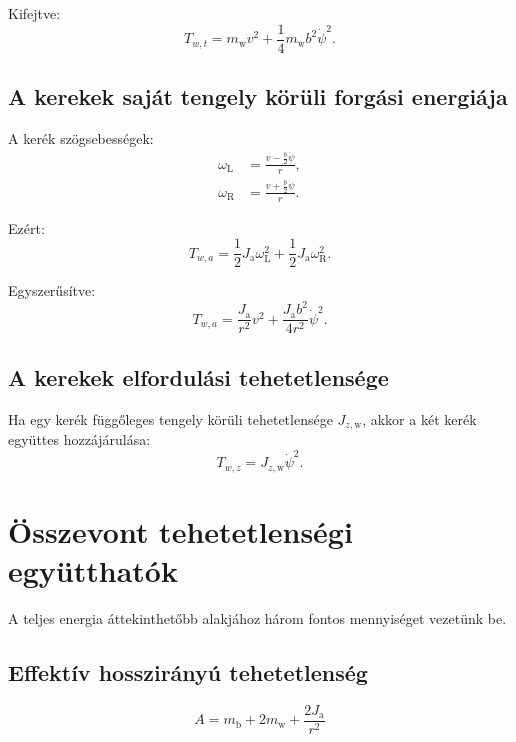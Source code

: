 \documentclass[12pt,a4paper]{article}
\newcommand{\mbody}{m_{\mathrm{b}}}
\newcommand{\mwheel}{m_{\mathrm{w}}}
\newcommand{\Jspin}{J_{\mathrm{a}}}
\newcommand{\Jzw}{J_{z,\mathrm{w}}}
\newcommand{\omegaL}{\omega_{\mathrm{L}}}
\newcommand{\omegaR}{\omega_{\mathrm{R}}}
\begin{document}
	Kifejtve:
	\begin{equation}
		T_{w,t}=\mwheel v^2+\frac{1}{4}\mwheel b^2\dot\psi^2.
	\end{equation}
	
	\subsection{A kerekek saját tengely körüli forgási energiája}
	
	A kerék szögsebességek:
	\begin{align*}
		\omegaL &= \frac{v-\frac{b}{2}\dot\psi}{r},\\
		\omegaR &= \frac{v+\frac{b}{2}\dot\psi}{r}.
	\end{align*}
	
	Ezért:
	\begin{equation}
		T_{w,a}=\frac{1}{2}\Jspin\omegaL^2+
		\frac{1}{2}\Jspin\omegaR^2.
	\end{equation}
	
	Egyszerűsítve:
	\begin{equation}
		T_{w,a}=\frac{\Jspin}{r^2}v^2
		+\frac{\Jspin b^2}{4r^2}\dot\psi^2.
	\end{equation}
	
	\subsection{A kerekek elfordulási tehetetlensége}
	
	Ha egy kerék függőleges tengely körüli tehetetlensége $\Jzw$, akkor a két kerék együttes hozzájárulása:
	\begin{equation}
		T_{w,z}=\Jzw\dot\psi^2.
	\end{equation}
	
	\section{Összevont tehetetlenségi együtthatók}
	
	A teljes energia áttekinthetőbb alakjához három fontos mennyiséget vezetünk be.
	
	\subsection{Effektív hosszirányú tehetetlenség}
	
	\begin{equation}
		\boxed{
			A=\mbody+2\mwheel+\frac{2\Jspin}{r^2}
		}
	\end{equation}
	
\end{document}

